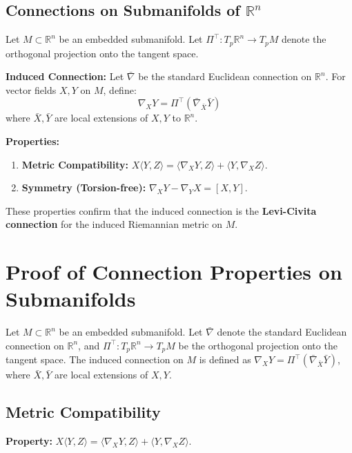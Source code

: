 \documentclass[11pt, a4paper]{article}
\theoremstyle{plain}
\theoremstyle{definition}
\theoremstyle{remark}
\begin{document}
\subsection{Connections on Submanifolds of $\mathbb{R}^n$}

Let $M \subset \mathbb{R}^n$ be an embedded submanifold. Let $\Pi^\top: T_p \mathbb{R}^n \to T_p M$ denote the orthogonal projection onto the tangent space.

\textbf{Induced Connection:}
Let $\bar{\nabla}$ be the standard Euclidean connection on $\mathbb{R}^n$. For vector fields $X, Y$ on $M$, define:
\[ \nabla_X Y = \Pi^\top (\bar{\nabla}_{\bar{X}} \bar{Y}) \]
where $\bar{X}, \bar{Y}$ are local extensions of $X, Y$ to $\mathbb{R}^n$.

\textbf{Properties:}
\begin{enumerate}
    \item \textbf{Metric Compatibility:} $X \langle Y, Z \rangle = \langle \nabla_X Y, Z \rangle + \langle Y, \nabla_X Z \rangle$.
    \item \textbf{Symmetry (Torsion-free):} $\nabla_X Y - \nabla_Y X = [X, Y]$.
\end{enumerate}
These properties confirm that the induced connection is the \textbf{Levi-Civita connection} for the induced Riemannian metric on $M$.

\section*{Proof of Connection Properties on Submanifolds}

Let $M \subset \mathbb{R}^n$ be an embedded submanifold. Let $\bar{\nabla}$ denote the standard Euclidean connection on $\mathbb{R}^n$, and $\Pi^\top: T_p \mathbb{R}^n \to T_p M$ be the orthogonal projection onto the tangent space. The induced connection on $M$ is defined as $\nabla_X Y = \Pi^\top (\bar{\nabla}_{\bar{X}} \bar{Y})$, where $\bar{X}, \bar{Y}$ are local extensions of $X, Y$.

\subsection*{Metric Compatibility}
\textbf{Property:} $X \langle Y, Z \rangle = \langle \nabla_X Y, Z \rangle + \langle Y, \nabla_X Z \rangle$.
\end{document}
